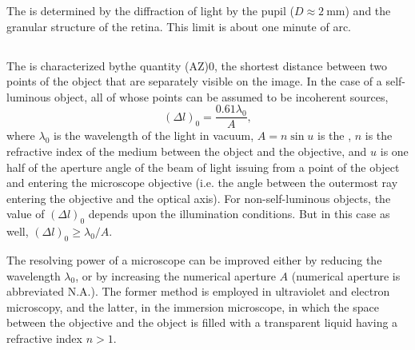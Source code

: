 The  is determined by the diffraction of light by the pupil ($D \approx \SI{2}{\milli\meter}$) and the granular structure of the retina. This limit is about one minute of arc.

\subsection{}\label{33.5.3} The  is characterized bythe quantity (AZ)0, the shortest distance between two points of the object that are separately visible on the image. In the case of a self-luminous object, all of whose points can be assumed to be incoherent sources, 
\begin{equation*}%
(\Delta l)_{0} = \frac{0.61 \lambda_{0}}{A},
\end{equation*}
where $\lambda_{0}$ is the wavelength of the light in vacuum, $A = n \sin u$ is the , $n$ is the refractive index of the medium between the object and the objective, and $u$ is one half of the aperture angle of the beam of light issuing from a point of the object and entering the microscope objective (i.e. the angle between the outermost ray entering the objective and the optical axis). For non-self-luminous objects, the value of $(\Delta l)_{0}$ depends upon the illumination conditions. But in this case as well, $(\Delta l)_{0} \geqslant \lambda_{0}/A$.

The resolving power of a microscope can be improved either
by reducing the wavelength $\lambda_{0}$, or by increasing the numerical aperture $A$ (numerical aperture is abbreviated N.A.). The former method is employed in ultraviolet and electron microscopy, and the latter, in the immersion microscope, in which the space between the objective and the object is filled with a transparent liquid having a refractive index $n > 1$.

